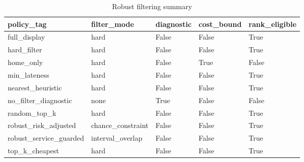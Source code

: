 \begin{table}[ht]
\centering
\begin{tabular}{lllll}
 \hline
policy\_tag & filter\_mode & diagnostic & cost\_bound & rank\_eligible \\
 \hline
full\_display & hard & False & False & True \\
hard\_filter & hard & False & False & True \\
home\_only & hard & False & True & False \\
min\_lateness & hard & False & False & True \\
nearest\_heuristic & hard & False & False & True \\
no\_filter\_diagnostic & none & True & False & False \\
random\_top\_k & hard & False & False & True \\
robust\_risk\_adjusted & chance\_constraint & False & False & True \\
robust\_service\_guarded & interval\_overlap & False & False & True \\
top\_k\_cheapest & hard & False & False & True \\
 \hline
\end{tabular}
\caption{Robust filtering summary}
\end{table}
